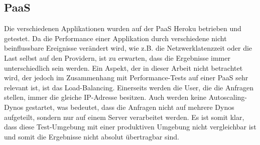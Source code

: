 \documentclass[main.tex]{subfiles}
\begin{document}
\subsection{PaaS}
Die verschiedenen Applikationen wurden auf der PaaS Heroku betrieben und getestet. Da die Performance einer Applikation durch verschiedene nicht beinflussbare Ereignisse verändert wird, wie z.B. die Netzwerklatenzzeit oder die Last selbst auf den Providern, ist zu erwarten, dass die Ergebnisse immer unterschiedlich sein werden. 
Ein Aspekt, der in dieser Arbeit nicht betrachtet wird, der jedoch im Zusammenhang mit Performance-Tests auf einer PaaS sehr relevant ist, ist das Load-Balancing. Einerseits werden die User, die die Anfragen stellen, immer die gleiche IP-Adresse besitzen. Auch werden keine Autoscaling-Dynos gestartet, was bedeutet, dass die Anfragen nicht auf mehrere Dynos aufgeteilt, sondern nur auf einem Server verarbeitet werden. Es ist somit klar, dass diese Test-Umgebung mit einer produktiven Umgebung nicht vergleichbar ist und somit die Ergebnisse nicht absolut übertragbar sind.
\end{document}

